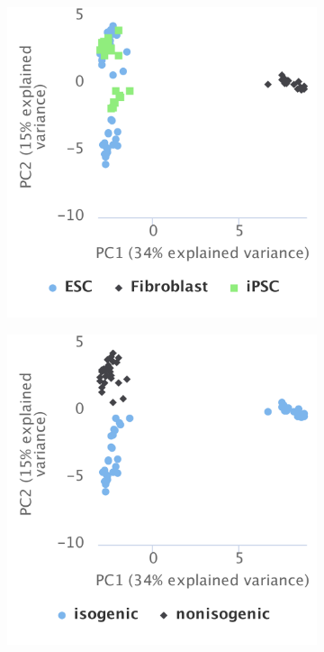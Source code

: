 \begin{figure}[!h]
\begin{subfigure}[h]{0.32\textwidth}
	\end{subfigure}
	\begin{subfigure}[h]{0.32\textwidth}
		\includegraphics[width=\textwidth]{images/psichomics/5-pca/e}
	\end{subfigure}
	\begin{subfigure}[h]{0.32\textwidth}
		\includegraphics[width=\textwidth]{images/psichomics/5-pca/f}

\end{subfigure}
\end{figure}
